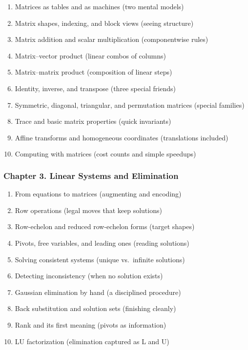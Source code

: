 \documentclass[
  letterpaper,
  DIV=11,
  numbers=noendperiod]{scrreprt}
\providecommand{\tightlist}{%
  \setlength{\itemsep}{0pt}\setlength{\parskip}{0pt}}
\begin{document}
\begin{enumerate}
\def\labelenumi{\arabic{enumi}.}
\setcounter{enumi}{10}
\tightlist
\item
  Matrices as tables and as machines (two mental models)
\item
  Matrix shapes, indexing, and block views (seeing structure)
\item
  Matrix addition and scalar multiplication (componentwise rules)
\item
  Matrix--vector product (linear combos of columns)
\item
  Matrix--matrix product (composition of linear steps)
\item
  Identity, inverse, and transpose (three special friends)
\item
  Symmetric, diagonal, triangular, and permutation matrices (special
  families)
\item
  Trace and basic matrix properties (quick invariants)
\item
  Affine transforms and homogeneous coordinates (translations included)
\item
  Computing with matrices (cost counts and simple speedups)
\end{enumerate}

\subsubsection{Chapter 3. Linear Systems and
Elimination}\label{chapter-3.-linear-systems-and-elimination}

\begin{enumerate}
\def\labelenumi{\arabic{enumi}.}
\setcounter{enumi}{20}
\tightlist
\item
  From equations to matrices (augmenting and encoding)
\item
  Row operations (legal moves that keep solutions)
\item
  Row-echelon and reduced row-echelon forms (target shapes)
\item
  Pivots, free variables, and leading ones (reading solutions)
\item
  Solving consistent systems (unique vs.~infinite solutions)
\item
  Detecting inconsistency (when no solution exists)
\item
  Gaussian elimination by hand (a disciplined procedure)
\item
  Back substitution and solution sets (finishing cleanly)
\item
  Rank and its first meaning (pivots as information)
\item
  LU factorization (elimination captured as L and U)
\end{enumerate}
\end{document}
